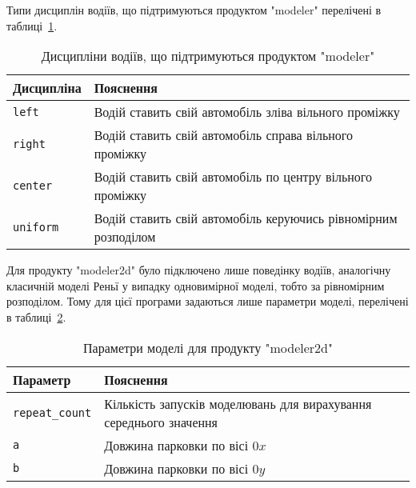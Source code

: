 Типи дисциплін водіїв, що підтримуються продуктом "modeler" перелічені в таблиці~\ref{tab:modeler_behaviours}.

\begin{table}[H]
	\caption{Дисципліни водіїв, що підтримуються продуктом "modeler"}
	\centering
\begin{tabular}{|p{}|p{}|}
	\hline
	Дисципліна & Пояснення \\
	\hline
	\verb!left! & Водій ставить свій автомобіль зліва вільного проміжку \\
	\hline
	\verb!right! & Водій ставить свій автомобіль справа вільного проміжку \\
	\hline
	\verb!center! & Водій ставить свій автомобіль по центру вільного проміжку \\
	\hline
	\verb!uniform! & Водій ставить свій автомобіль керуючись рівномірним розподілом \\
	\hline
\end{tabular}	
	\label{tab:modeler_behaviours}
\end{table}

Для продукту "modeler2d" було підключено лише поведінку водіїв, аналогічну класичній моделі Реньї у випадку одновимірної моделі, тобто за рівномірним розподілом. Тому для цієї програми задаються лише параметри моделі, перелічені в таблиці~\ref{tab:modeler2d_model_params}.

\begin{table}[H]
	\caption{Параметри моделі для продукту "modeler2d"}
	\centering
\begin{tabular}{|p{}|p{}|}
	\hline
	Параметр & Пояснення \\
	\hline
	\verb!repeat_count! & Кількість запусків моделювань для вирахування середнього значення \\
	\hline
	\verb!a! & Довжина парковки по вісі $0x$ \\
	\hline
	\verb!b! & Довжина парковки по вісі $0y$ \\
	\hline
\end{tabular}	
	\label{tab:modeler2d_model_params}
\end{table}
